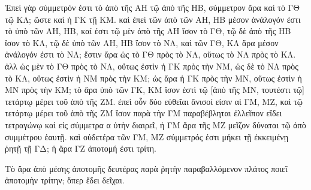 \begin{Parallel}{}{}
{{\greekfont Ἐπεὶ γὰρ σύμμετρόν ἐστι τὸ ἀπὸ τῆς ΑΗ τῷ ἀπὸ τῆς ΗΒ, σύμμετρον ἄρα καὶ τὸ ΓΘ τῷ ΚΛ; ὥστε καὶ ἡ ΓΚ τῇ ΚΜ. καὶ
ἐπεὶ τῶν ἀπὸ τῶν ΑΗ, ΗΒ μέσον ἀνάλογόν ἐστι τὸ ὑπὸ
τῶν ΑΗ, ΗΒ, καί ἐστι τῷ μὲν ἀπὸ τῆς ΑΗ ἴσον τὸ ΓΘ, τῷ
δὲ ἀπὸ τῆς ΗΒ ἴσον τὸ ΚΛ,  τῷ δὲ ὑπὸ τῶν ΑΗ, ΗΒ ἴσον
τὸ ΝΛ, καὶ τῶν ΓΘ, ΚΛ ἄρα μέσον ἀνάλογόν ἐστι τὸ ΝΛ; ἔστιν
ἄρα ὡς τὸ ΓΘ πρὸς τὸ ΝΛ, οὕτως τὸ ΝΛ πρὸς τὸ ΚΛ. ἀλλ
ὡς μὲν τὸ ΓΘ πρὸς τὸ ΝΛ, οὕτως ἐστὶν ἡ  ΓΚ πρὸς τὴν ΝΜ,
ὡς δὲ τὸ ΝΛ πρὸς τὸ ΚΛ, οὕτως ἐστὶν ἡ ΝΜ πρὸς τὴν ΚΜ; ὡς
ἄρα ἡ ΓΚ πρὸς τὴν ΜΝ, οὕτως ἐστὶν ἡ ΜΝ πρὸς τὴν
ΚΜ; τὸ ἄρα ὑπὸ τῶν ΓΚ, ΚΜ ἴσον ἐστὶ τῷ [ἀπὸ
τῆς ΜΝ, τουτέστι τῷ] τετάρτῳ μέρει τοῦ ἀπὸ τῆς ΖΜ. ἐπεὶ
οὖν δύο εὐθεῖαι ἄνισοί εἰσιν αἱ ΓΜ, ΜΖ, καὶ τῷ τετάρτῳ
μέρει τοῦ ἀπὸ τῆς ΖΜ ἴσον παρὰ τὴν ΓΜ παραβέβληται ἐλλεῖπον
εἴδει τετραγώνῳ καὶ εἰς σύμμετρα α ὐτὴν διαιρεῖ, ἡ ΓΜ ἄρα
τῆς ΜΖ μεῖζον δύναται τῷ ἀπὸ συμμέτρου ἑαυτῇ. καὶ
οὐδετέρα τῶν ΓΜ, ΜΖ σύμμετρός ἐστι μήκει τῇ ἐκκειμένῃ
ῥητῇ τῇ ΓΔ; ἡ ἄρα ΓΖ ἀποτομή ἐστι τρίτη.}

{\greekfont Τὸ ἄρα ἀπὸ μέσης ἀποτομῆς δευτέρας παρὰ ῥητὴν παραβαλλόμενον πλάτος ποιεῖ ἀποτομὴν τρίτην; ὅπερ ἔδει δεῖχαι.}}

\end{Parallel}
